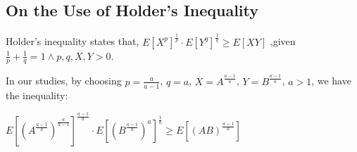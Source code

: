 \documentclass[14pt,onecolumn,letterpaper]{extarticle}
\begin{document}
\subsection{On the Use of Holder's Inequality}
Holder's inequality states that, $E\left[X^p\right]^{\frac{1}{p}}\cdot E\left[Y^q\right]^{\frac{1}{q}}\geq E\left[XY\right]$ ,given $\frac{1}{p}+\frac{1}{q}=1\land p,q,X,Y > 0$.\par
In our studies, by choosing $p=\frac{a}{a-1}$, $q=a$, $X=A^\frac{a-1}{a}$, $Y=B^\frac{a-1}{a}$, $a > 1$, we have the inequality:\par
$E\left[\left(A^\frac{a-1}{a}\right)^\frac{a}{a-1}\right]^\frac{a-1}{a} \cdot E\left[\left(B^\frac{a-1}{a}\right)^a\right]^\frac{1}{a} \geq E\left[\left(AB\right)^\frac{a-1}{a}\right]$


% 
\end{document}
